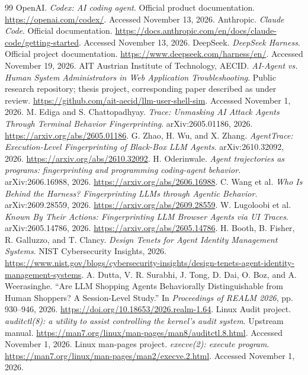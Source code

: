 \documentclass[10pt]{article}
\begin{document}
\begin{thebibliography}{99}
 OpenAI. \emph{Codex: AI coding agent}. Official product documentation. \url{https://openai.com/codex/}. Accessed November 13, 2026.
 Anthropic. \emph{Claude Code}. Official documentation. \url{https://docs.anthropic.com/en/docs/claude-code/getting-started}. Accessed November 13, 2026.
 DeepSeek. \emph{DeepSeek Harness}. Official project documentation. \url{https://www.deepseek.com/harness/en/}. Accessed November 19, 2026.
 AIT Austrian Institute of Technology, AECID. \emph{AI-Agent vs. Human System Administrators in Web Application Troubleshooting}. Public research repository; thesis project, corresponding paper described as under review. \url{https://github.com/ait-aecid/llm-user-shell-sim}. Accessed November 1, 2026.
 M. Ediga and S. Chattopadhyay. \emph{Trace: Unmasking AI Attack Agents Through Terminal Behavior Fingerprinting}. arXiv:2605.01186, 2026. \url{https://arxiv.org/abs/2605.01186}.
 G. Zhao, H. Wu, and X. Zhang. \emph{AgentTrace: Execution-Level Fingerprinting of Black-Box LLM Agents}. arXiv:2610.32092, 2026. \url{https://arxiv.org/abs/2610.32092}.
 H. Oderinwale. \emph{Agent trajectories as programs: fingerprinting and programming coding-agent behavior}. arXiv:2606.16988, 2026. \url{https://arxiv.org/abs/2606.16988}.
 C. Wang et al. \emph{Who Is Behind the Harness? Fingerprinting LLMs through Agentic Behavior}. arXiv:2609.28559, 2026. \url{https://arxiv.org/abs/2609.28559}.
 W. Lugoloobi et al. \emph{Known By Their Actions: Fingerprinting LLM Browser Agents via UI Traces}. arXiv:2605.14786, 2026. \url{https://arxiv.org/abs/2605.14786}.
 H. Booth, B. Fisher, R. Galluzzo, and T. Clancy. \emph{Design Tenets for Agent Identity Management Systems}. NIST Cybersecurity Insights, 2026. \url{https://www.nist.gov/blogs/cybersecurity-insights/design-tenets-agent-identity-management-systems}.
 A. Dutta, V. R. Surabhi, J. Tong, D. Dai, O. Boz, and A. Weerasinghe. ``Are LLM Shopping Agents Behaviorally Distinguishable from Human Shoppers? A Session-Level Study.'' In \emph{Proceedings of REALM 2026}, pp. 930--946, 2026. \url{https://doi.org/10.18653/2026.realm-1.64}.
 Linux Audit project. \emph{auditctl(8): a utility to assist controlling the kernel's audit system}. Upstream manual. \url{https://man7.org/linux/man-pages/man8/auditctl.8.html}. Accessed November 1, 2026.
 Linux man-pages project. \emph{execve(2): execute program}. \url{https://man7.org/linux/man-pages/man2/execve.2.html}. Accessed November 1, 2026.

\end{thebibliography}
\end{document}
